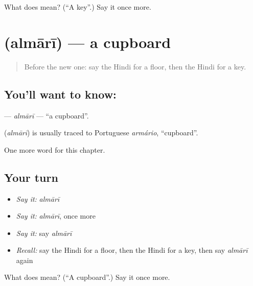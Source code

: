 \begin{tcolorbox}[breakable,colback=teal!4,colframe=teal!35!black,title={Before you move on}]
What does  mean? (\textquotedblleft{}A key\textquotedblright{}.) Say it once more.
\end{tcolorbox}
\section[\texorpdfstring{\hi{अलमारी} (almārī)}{अलमारी (almārī)}]{ (almārī) — a cupboard}

\label{lesson:HI-C184-almari}



\begin{quote}
Before the new one: say the Hindi for a floor, then the Hindi for a key.
\end{quote}

\subsection*{You'll want to know: }
\textbf{} — \emph{almārī} — \textquotedblleft{}a cupboard\textquotedblright{}.

\begin{cousinweb}
\textbf{} (\emph{almārī}) is usually traced to Portuguese \emph{armário}, \textquotedblleft{}cupboard\textquotedblright{}.
\end{cousinweb}

\begin{grammarlens}[title={What you've built}]
One more word for this chapter.
\end{grammarlens}

\subsection*{Your turn}
\begin{itemize}
\raggedright
  \item \emph{Say it:} \emph{almārī}
  \item \emph{Say it:} \emph{almārī}, once more
  \item \emph{Say it:} say \emph{almārī}
  \item \emph{Recall:} say the Hindi for a floor, then the Hindi for a key, then say \emph{almārī} again
\end{itemize}

\begin{tcolorbox}[breakable,colback=teal!4,colframe=teal!35!black,title={Before you move on}]
What does  mean? (\textquotedblleft{}A cupboard\textquotedblright{}.) Say it once more.
\end{tcolorbox}
